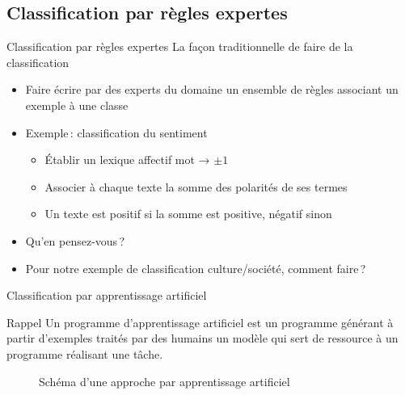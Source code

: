 \documentclass[../allslides.tex]{subfiles}
\begin{document}
\subsection{Classification par règles expertes}
\begin{frame}{Classification par règles expertes}
    La façon traditionnelle de faire de la classification
    \begin{itemize}
        \item<+-> Faire écrire par des experts du domaine un ensemble de règles associant un exemple à une classe
        \item<+-> Exemple : classification du sentiment
			\begin{itemize}
                \item Établir un lexique affectif mot → \(±1\)
                \item Associer à chaque texte la somme des polarités de ses termes
                \item Un texte est positif si la somme est positive, négatif sinon
            \end{itemize}
        \item<+-> Qu'en pensez-vous ?
        \item<+-> Pour notre exemple de classification culture/société, comment faire ?
    \end{itemize}
\end{frame}

\begin{frame}{Classification par apprentissage artificiel}
    \begin{block}{Rappel}
        Un \textcolor{highlight0}{programme d'apprentissage artificiel} est un programme générant à partir d'\textcolor{highlight2}{exemples} traités par des humains un \textcolor{highlight4}{modèle} qui sert de ressource à un \textcolor{highlight5}{programme réalisant une tâche}.
    \end{block}
    \begin{figure}
        \tikzset{external/export=true}
        \caption{Schéma d'une approche par apprentissage artificiel}
    \end{figure}
\end{frame}
\end{document}
